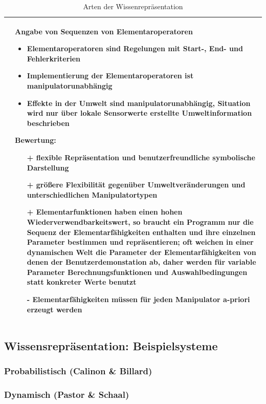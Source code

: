 \begin{table}[hbt]
\begin{tabular}{|p{8cm}|p{8cm}|}
\begin{itemize}
\end{itemize}
 &
 Angabe von Sequenzen von Elementaroperatoren
 \vspace{-4mm}
\begin{itemize}
\setlength\itemsep{0em}
\item Elementaroperatoren sind Regelungen mit Start-, End- und Fehlerkriterien
\item Implementierung der Elementaroperatoren ist manipulatorunabhängig
\item Effekte in der Umwelt sind manipulatorunabhängig, Situation wird nur über lokale Sensorwerte erstellte Umweltinformation beschrieben
\end{itemize}
Bewertung:
\begin{itemize}
\setlength\itemsep{0em}
\item[+] flexible Repräsentation und benutzerfreundliche symbolische Darstellung
\item[+] größere Flexibilität gegenüber Umweltveränderungen und unterschiedlichen Manipulatortypen
\item[+] Elementarfunktionen haben einen hohen Wiederverwendbarkeitswert, so braucht ein Programm nur die Sequenz der Elementarfähigkeiten
enthalten und ihre einzelnen Parameter bestimmen und repräsentieren;  oft weichen in einer
dynamischen Welt die Parameter der Elementarfähigkeiten von denen der Benutzerdemonstation ab, daher werden für variable Parameter Berechnungsfunktionen und
Auswahlbedingungen statt konkreter Werte benutzt
\item[-] Elementarfähigkeiten müssen für jeden Manipulator a-priori erzeugt werden 
\end{itemize}\\
\hline
\end{tabular}
\caption{Arten der Wissenrepräsentation}
\label{tab:Wissrep}
\end{table}

\subsection{Wissensrepräsentation: Beispielsysteme}
\subsubsection*{Probabilistisch (Calinon \& Billard)}
\subsubsection*{Dynamisch (Pastor \& Schaal)}

